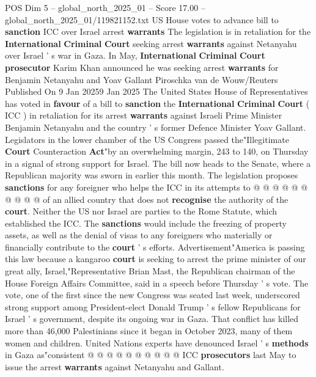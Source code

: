 \begin{textsample}{POS Dim 5 – global\_north\_2025\_01 – Score 17.00 – global\_north\_2025\_01/119821152.txt}  \label{ex:f5_pos_266}
US House votes to advance bill to \textbf{sanction} ICC over Israel arrest \textbf{warrants} The legislation is in retaliation for the \textbf{International} \textbf{Criminal} \textbf{Court} seeking arrest \textbf{warrants} against Netanyahu over Israel ' s war in Gaza.
In May, \textbf{International} \textbf{Criminal} \textbf{Court} \textbf{prosecutor} Karim Khan announced he was seeking arrest \textbf{warrants} for Benjamin Netanyahu and Yoav Gallant Piroschka van de Wouw/Reuters Published On 9 Jan 20259 Jan 2025 The United States House of Representatives has voted in \textbf{favour} of a bill to \textbf{sanction} the \textbf{International} \textbf{Criminal} \textbf{Court} ( ICC ) in retaliation for its arrest \textbf{warrants} against Israeli Prime Minister Benjamin Netanyahu and the country ' s former Defence Minister Yoav Gallant.
Legislators in the lower chamber of the US Congress passed the"Illegitimate \textbf{Court} Counteraction \textbf{Act}"by an overwhelming margin, 243 to 140, on Thursday in a signal of strong support for Israel.
The bill now heads to the Senate, where a Republican majority was sworn in earlier this month.
The legislation proposes \textbf{sanctions} for any foreigner who helps the ICC in its attempts to @ @ @ @ @ @ @ @ @ @ of an allied country that does not \textbf{recognise} the authority of the \textbf{court}.
Neither the US nor Israel are parties to the Rome Statute, which established the ICC.
The \textbf{sanctions} would include the freezing of property assets, as well as the denial of visas to any foreigners who materially or financially contribute to the \textbf{court} ' s efforts.
Advertisement"America is passing this law because a kangaroo \textbf{court} is seeking to arrest the prime minister of our great ally, Israel,"Representative Brian Mast, the Republican chairman of the House Foreign Affairs Committee, said in a speech before Thursday ' s vote.
The vote, one of the first since the new Congress was seated last week, underscored strong support among President-elect Donald Trump ' s fellow Republicans for Israel ' s government, despite its ongoing war in Gaza.
That conflict has killed more than 46,000 Palestinians since it began in October 2023, many of them women and children.
United Nations experts have denounced Israel ' s \textbf{methods} in Gaza as"consistent @ @ @ @ @ @ @ @ @ @ ICC \textbf{prosecutors} last May to issue the arrest \textbf{warrants} against Netanyahu and Gallant.

\end{textsample}

